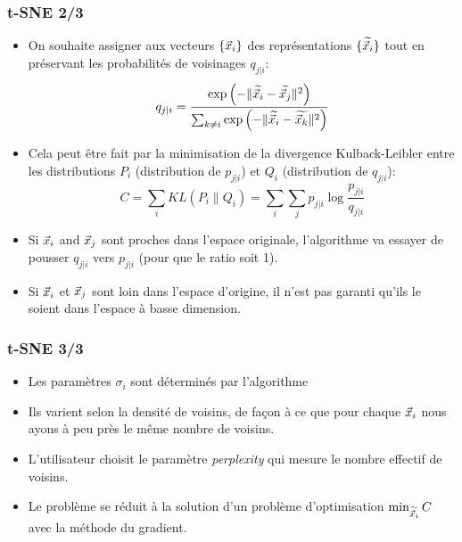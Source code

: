 \begin{frame}
\frametitle{t-SNE 2/3}
\begin{itemize}
	\item On souhaite assigner aux vecteurs $\{\vec{x}_i\}$ des représentations $\{\widetilde{\vec{x}_i}\}$ tout en préservant les probabilités de voisinages $q_{j|i}$: 
	\begin{equation*}
	q_{j|i} = \frac{\exp{\left(-\|\widetilde{\vec{x}_i} - \widetilde{\vec{x}_j}\|^2\right)}}{\sum_{k\neq i} \exp{\left(-\|\widetilde{\vec{x}_i} - \widetilde{\vec{x}_k}\|^2\right)} }
	\end{equation*}
	\item Cela peut être fait par la minimisation de la divergence Kulback-Leibler entre les distributions $P_i$ (distribution de $p_{j|i}$) et $Q_i$ (distribution de $q_{j|i}$): 
	\begin{equation}
		C = \sum_i KL(P_i\|Q_i) = \sum_i \sum_j p_{j|i}\log{\frac{p_{j|i}}{q_{j|i}}}
	\end{equation}
	\item Si $\vec{x}_i$ and $\vec{x}_j$ sont proches dans l'espace originale, l'algorithme va essayer de pousser $q_{j|i}$ vers $p_{j|i}$ (pour que le ratio soit 1). 
	\item Si $\vec{x}_i$ et $\vec{x}_j$ sont loin dans l'espace d'origine, il n'est pas garanti qu'ils le soient dans l'espace à basse dimension. 
\end{itemize}
\end{frame}

\begin{frame}
\frametitle{t-SNE 3/3}
\begin{itemize}
	\item Les paramètres $\sigma_i$ sont déterminés par l'algorithme
	\item Ils varient selon la densité de voisins, de façon à ce que pour chaque $\vec{x}_i$ nous ayons à peu près le même nombre de voisins. 
	\item L'utilisateur choisit le paramètre \textit{perplexity} qui mesure le nombre effectif de voisins. 
	\item Le problème se réduit à la solution d'un problème d'optimisation $\min_{\widetilde{\vec{x}_i}} C$ avec la méthode du gradient.
\end{itemize}
\end{frame}


